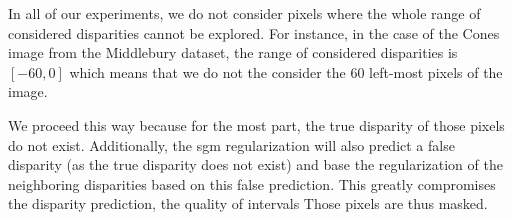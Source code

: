 \begin{remark}
    In all of our experiments, we do not consider pixels where the whole range of considered disparities cannot be explored. For instance, in the case of the Cones image from the Middlebury dataset, the range of considered disparities is $[-60,0]$ which means that we do not the consider the 60 left-most pixels of the image.
    
    We proceed this way because for the most part, the true disparity of those pixels do not exist. Additionally, the \acrshort{sgm} regularization will also predict a false disparity (as the true disparity does not exist) and base the regularization of the neighboring disparities based on this false prediction. This greatly compromises the disparity prediction, the quality of intervals \etc Those pixels are thus masked.
\end{remark}

